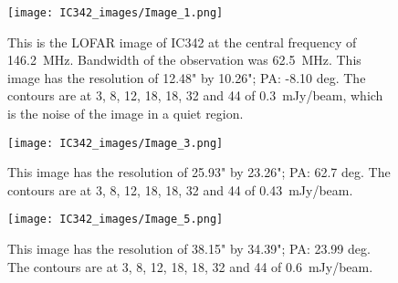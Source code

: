 \documentclass[../main/thesis_msc.tex]{subfiles}
\begin{document}
\begin{figure}[h]
\centering
\texttt{[image: IC342\_images/Image\_1.png]}
\caption{This is the LOFAR image of IC342 at the central frequency of 146.2~MHz. Bandwidth of the observation was 62.5~MHz. This image has the resolution of 12.48" by 10.26"; PA: -8.10 deg. The contours are at 3, 8, 12, 18, 18, 32 and 44 of 0.3~mJy/beam, which is the noise of the image in a quiet region.}
\label{img1}
\end{figure}

\begin{figure}[h]
\centering
\texttt{[image: IC342\_images/Image\_3.png]}
\caption{This image has the resolution of 25.93" by 23.26"; PA: 62.7 deg. The contours are at 3, 8, 12, 18, 18, 32 and 44 of 0.43~mJy/beam.}
\label{img2}
\end{figure}

\begin{figure}[h]
\centering
\texttt{[image: IC342\_images/Image\_5.png]}
\caption{This image has the resolution of 38.15" by 34.39"; PA: 23.99 deg. The contours are at 3, 8, 12, 18, 18, 32 and 44 of 0.6~mJy/beam.}
\label{img3}
\end{figure}
\end{document}

